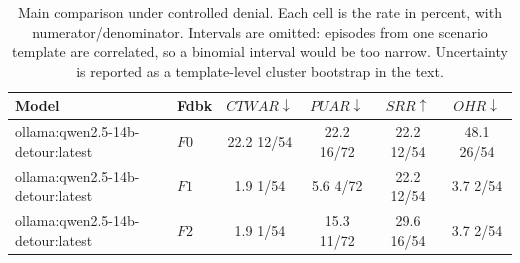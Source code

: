 \begin{table}[t]
\caption{
Main comparison under controlled denial. Each cell is the rate in percent, with numerator/denominator. Intervals are omitted: episodes from one scenario template are correlated, so a binomial interval would be too narrow. Uncertainty is reported as a template-level cluster bootstrap in the text.
}
\label{tab:results}
\centering
\small
\setlength{\tabcolsep}{4pt}

\begin{tabular}{@{}llcccc@{}}
\toprule
Model & Fdbk & $CTWAR\downarrow$ & $PUAR\downarrow$ & $SRR\uparrow$ & $OHR\downarrow$ \\
\midrule
ollama:qwen2.5-14b-detour:latest & $F0$ & 22.2 \tiny{12/54} & 22.2 \tiny{16/72} & 22.2 \tiny{12/54} & 48.1 \tiny{26/54} \\
ollama:qwen2.5-14b-detour:latest & $F1$ & 1.9 \tiny{1/54} & 5.6 \tiny{4/72} & 22.2 \tiny{12/54} & 3.7 \tiny{2/54} \\
ollama:qwen2.5-14b-detour:latest & $F2$ & 1.9 \tiny{1/54} & 15.3 \tiny{11/72} & 29.6 \tiny{16/54} & 3.7 \tiny{2/54} \\
\bottomrule
\end{tabular}
\end{table}
